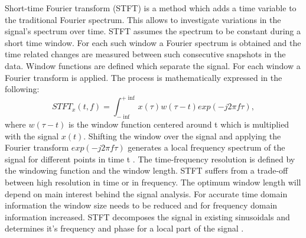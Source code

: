 Short-time Fourier transform (STFT) is a method which adds a time variable to the traditional Fourier spectrum. This allows to investigate variations in the signal's spectrum over time. STFT assumes the spectrum to be constant during a short time window. For each such window a Fourier spectrum is obtained and the time related changes are measured between such consecutive snapshots in the data. Window functions are defined which separate the signal. For each window a Fourier transform is applied. The process is mathematically expressed in the following:  
\begin{equation}
    STFT_{x}(t,f) = \int_{- \inf}^{+ \inf}x(\tau) w(\tau -t) exp(-j2\pi f \tau),
\end{equation}
where  $w(\tau -t)$ is the window function centered around t which is multiplied with the signal $x(t)$. Shifting the window over the signal and applying the Fourier transform $exp(-j2\pi f \tau)$ generates a local frequency spectrum of the signal for different points in time t \cite{FENG2013}. The time-frequency resolution is defined by the windowing function and the window length. STFT suffers from a trade-off between high resolution in time or in frequency. The optimum window length will depend on main interest behind the signal analysis. For accurate time domain information the window size needs to be reduced and for frequency domain information increased. STFT  decomposes the signal in existing sinusoidals and determines it's frequency and phase for a local part of the signal \cite{Hlawatsch1992}. 

